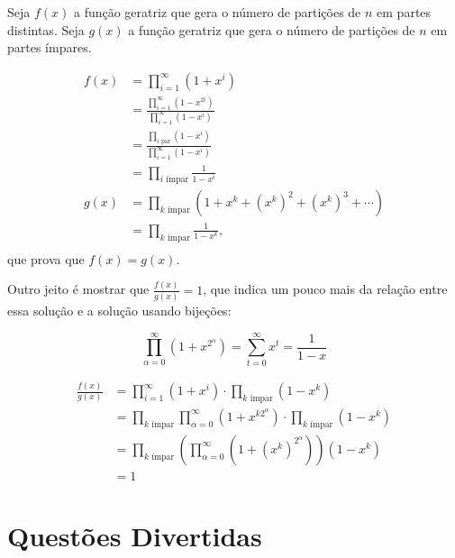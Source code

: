 \documentclass[10pt, a4paper]{article}
\begin{document}
	\begin{sol}
		Seja $f(x)$ a função geratriz que gera o número de partições de $n$ em partes distintas.
		Seja $g(x)$ a função geratriz que gera o número de partições de $n$ em partes ímpares.

		\begin{align*}
			f(x) & = \prod_{i=1}^{\infty} (1+x^i)\\
				 & = \frac{\prod_{i=1}^{\infty} (1-x^{2i})}{\prod_{i=1}^{\infty} (1-x^i)}\\ 
				 & = \frac{\prod_{i\text{ par}} (1-x^i)}{\prod_{i=1}^{\infty} (1-x^i)}\\
				 & = \prod_{i\text{ ímpar}} \frac{1}{1-x^i} \\
			g(x) & = \prod_{k\text{ ímpar}} (1 + x^k + (x^k)^2 + (x^k)^3 + \cdots)\\
				 & = \prod_{k\text{ ímpar}} \frac{1}{1-x^k},\\
		\end{align*}
		que prova que $f(x) = g(x)$.

		Outro jeito é mostrar que $\frac{f(x)}{g(x)} = 1$, que indica um pouco mais da relação entre essa solução e a solução usando bijeções:
		\begin{lem}
			\[\prod_{\alpha = 0}^{\infty} (1+x^{2^\alpha}) = \sum_{t=0}^{\infty} x^t = \frac{1}{1-x}\]
		\end{lem}

		\begin{align*}
			\frac{f(x)}{g(x)} & = \prod_{i=1}^{\infty} (1+x^i) \cdot \prod_{k\text{ ímpar}} (1-x^k)\\
							  & = \prod_{k\text{ ímpar}} \prod_{\alpha = 0}^{\infty} (1+x^{k2^\alpha}) \cdot \prod_{k\text{ ímpar}} (1-x^k)\\
							  & = \prod_{k\text{ ímpar}} \left(\prod_{\alpha = 0}^{\infty} (1+(x^k)^{2^\alpha})\right) (1-x^k)\\
						  	  & = 1
		\end{align*}

	\end{sol}


	\newpage

	\section{Questões Divertidas}
\end{document}

